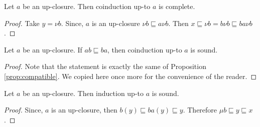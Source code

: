 \documentclass{llncs}
\begin{document}
\begin{lemma}
Let $a$ be an up-closure. Then coinduction up-to $a$ is complete.
\end{lemma}
\begin{proof} 
Take $y=\nu b$. Since, $a$ is an up-closure $\nu b \sqsubseteq a \nu b$. Then $x\sqsubseteq \nu b =b \nu b \sqsubseteq ba\nu b$.
\end{proof}

\begin{lemma}
Let $a$ be an up-closure. If $ab\sqsubseteq ba$, then coinduction up-to $a$ is sound.
\end{lemma}
\begin{proof}
Note that the statement is exactly the same of Proposition \ref{prop:compatible}. We copied here once more for the convenience of the reader.
\end{proof}


\begin{lemma}
Let $a$ be an up-closure. Then induction up-to $a$ is sound.
\end{lemma}
\begin{proof} 
Since, $a$ is an up-closure, then $b(y) \sqsubseteq ba(y) \sqsubseteq y$. Therefore $\mu b \sqsubseteq y \sqsubseteq x$.
\end{proof}


%
%
%
\end{document}
